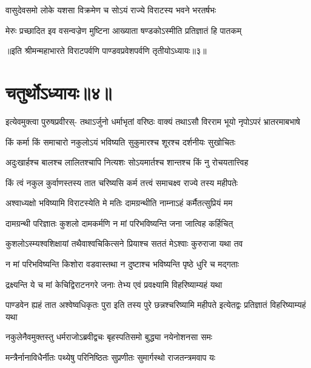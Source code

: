 


\twolineshloka
{वासुदेवसमो लोके यशसा विक्रमेण च}
{सोऽयं राज्ये विराटस्य भवने भरतर्षभः}


\twolineshloka
{मेरुः प्रच्छादित इव वसन्वज्रेण मुष्टिना}
{आख्याता षण्डकोऽस्मीति प्रतिज्ञातं हि पातकम्}

॥इति श्रीमन्महाभारते विराटपर्वणि पाण्डवप्रवेशपर्वणि तृतीयोऽध्यायः॥३॥

\chapter{चतुर्थोऽध्यायः॥४॥}

\fourlineindentedshloka
{इत्येवमुक्त्वा पुरुषप्रवीरस्-}
{तथाऽर्जुनो धर्माभृतां वरिष्ठः}
{वाक्यं तथाऽसौ विरराम भूयो}
{नृपोऽपरं भ्रातरमाबभाषे}


\twolineshloka
{किं कर्मा किं समाचारो नकुलोऽयं भविष्यति}
{सुकुमारश्च शूरश्च दर्शनीयः सुखोचितः}


\twolineshloka
{अदुःखार्हश्च बालश्च लालितश्चापि नित्यशः}
{सोऽयमार्तश्च शान्तश्च किं नु रोचयतात्त्विह}


\twolineshloka
{किं त्वं नकुल कुर्वाणस्तस्य तात चरिष्यसि}
{कर्म तत्त्वं समाचक्ष्व राज्ये तस्य महीपतेः}




\twolineshloka
{अश्वाध्यक्षो भविष्यामि विराटस्येति मे मतिः}
{दामग्रन्थीति नाम्नाऽहं कर्मैतत्सुप्रियं मम}


\twolineshloka
{दामग्रन्थी परिज्ञातः कुशलो दामकर्मणि}
{न मां परिभविष्यन्ति जना जात्विह कर्हिचित्}


\twolineshloka
{कुशलोऽस्म्यश्वशिक्षायां तथैवाश्वचिकित्सने}
{प्रियाश्च सततं मेऽश्वाः कुरुराजा यथा तव}


\twolineshloka
{न मां परिभविष्यन्ति किशोरा वडवास्तथा}
{न दुष्टाश्च भविष्यन्ति पृष्ठे धुरि च मद्गताः}


\twolineshloka
{द्रक्ष्यन्ति ये च मां केचिद्विराटनगरे जनाः}
{तेभ्य एवं प्रवक्ष्यामि विहरिष्याम्यहं यथा}


\threelineshloka
{पाण्डवेन ह्यहं तात अश्वेष्वधिकृतः पुरा}
{इति तस्य पुरे छन्नश्चरिष्यामि महीपते}
{इत्येतद्वः प्रतिज्ञातं विहरिष्याम्यहं यथा}



\twolineshloka
{नकुलेनैवमुक्तस्तु धर्मराजोऽब्रवीद्वचः}
{बृहस्पतिसमो बुद्ध्या नयेनोशनसा समः}


\twolineshloka
{मन्त्रैर्नानाविधैर्नीतः पथ्येषु परिनिष्ठितः}
{सुप्रणीतः सुमार्गस्थो राजतन्त्रमवाप यः}


